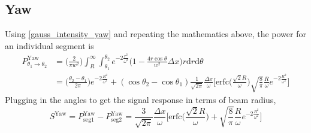 \begin{appendices}
	\subsection{Yaw}
	Using \ref{gauss_intensity_yaw} and repeating the mathematics above, the power for an individual segment is
	\begin{equation}
	\begin{split}
	P^{\text{Yaw}}_{\theta_1 \rightarrow \theta_2} 	&=  \bigg(\frac{2}{\pi w^2}\bigg) \int_{R}^{\infty} \int_{\theta_1}^{\theta_2} e^{-2 \frac{r^2}{\omega^2}}  \bigg(1-\frac{4 r \cos \theta}{w^2}\Delta x\bigg) r \text{d}r \text{d} \theta\\
	&= \bigg( \frac{\theta_2-\theta_1}{2 \pi}\bigg) e^{-2 \frac{R^2}{\omega^2}} + (\cos \theta_2 - \cos \theta_1) \frac{1}{\sqrt{2 \pi}} \frac{\Delta x}{\omega} \bigg[ 	  \text{erfc} \bigg(\frac{\sqrt{2} R}{\omega}\bigg) \sqrt{\frac{8}{\pi}} \frac{R}{\omega} e^{-2 \frac{R^2}{\omega^2}}\bigg]
	\end{split}
	\end{equation}
	Plugging in the angles to get the signal response in terms of beam radius,
	\begin{equation}
	S^{\text{Yaw}} = P^{\text{Yaw}}_{\text{seg1}} - P^{\text{Yaw}}_{\text{seg2}} = \frac{3}{\sqrt{2\pi}} \frac{\Delta x}{\omega} \bigg[ \text{erfc} \bigg(\frac{\sqrt{2} R}{\omega}\bigg) + \sqrt{\frac{8}{\pi }} \frac{R}{\omega} e^{-2 \frac{R^2}{\omega^2}} \bigg]
	\end{equation}


\end{appendices}
